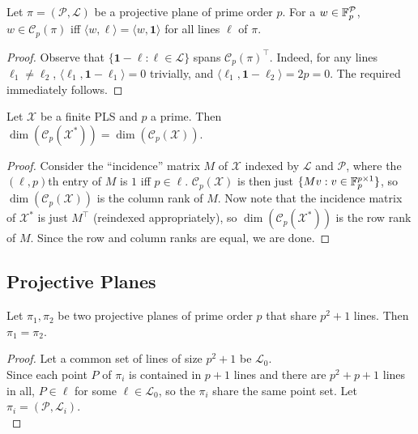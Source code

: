 	\begin{lemma}
		\label{lem: 1.2}
		Let $\pi = (\mathcal{P},\mathcal{L})$ be a projective plane of prime order $p$. For a $w \in \mathbb{F}_p^{\mathcal{P}}$, $w \in \mathcal{C}_p(\pi)$ iff $\langle w,\ell \rangle = \langle w, \textbf{1} \rangle$ for all lines $\ell$ of $\pi$.
	\end{lemma}
	\begin{proof}
		Observe that $\{ \textbf{1} - \ell : \ell \in \mathcal{L} \}$ spans $\mathcal{C}_p(\pi)^\top$. Indeed, for any lines $\ell_1 \ne \ell_2$, $\langle \ell_1, \textbf{1} - \ell_1 \rangle = 0$ trivially, and $\langle \ell_1, \textbf{1} - \ell_2 \rangle = 2p = 0$. The required immediately follows.
	\end{proof}

	\begin{lemma}
		Let $\mathcal{X}$ be a finite PLS and $p$ a prime. Then $\dim(\mathcal{C}_p(\mathcal{X}^*)) = \dim(\mathcal{C}_p(\mathcal{X}))$.
	\end{lemma}
	\begin{proof}
		Consider the ``incidence'' matrix $M$ of $\mathcal{X}$ indexed by $\mathcal{L}$ and $\mathcal{P}$, where the $(\ell,p)$th entry of $M$ is $1$ iff $p \in \ell$. $\mathcal{C}_p(\mathcal{X})$ is then just $\{Mv : v \in \mathbb{F}_p^{p \times 1}\}$, so $\dim(\mathcal{C}_p(\mathcal{X}))$ is the column rank of $M$. Now note that the incidence matrix of $\mathcal{X}^*$ is just $M^\top$ (reindexed appropriately), so $\dim(\mathcal{C}_p(\mathcal{X}^*))$ is the row rank of $M$. Since the row and column ranks are equal, we are done.
	\end{proof}

\subsection{Projective Planes}

	\begin{lemma}
		\label{lemma: common lines implies same plane}
		Let $\pi_1,\pi_2$ be two projective planes of prime order $p$ that share $p^2+1$ lines. Then $\pi_1 = \pi_2$.
	\end{lemma}
	\begin{proof}
		Let a common set of lines of size $p^2 + 1$ be $\mathcal{L}_0$.\\
		Since each point $P$ of $\pi_i$ is contained in $p+1$ lines and there are $p^2 + p + 1$ lines in all, $P \in \ell$ for some $\ell \in \mathcal{L_0}$, so the $\pi_i$ share the same point set. Let $\pi_i = (\mathcal{P},\mathcal{L}_i)$.\\

	\end{proof}

